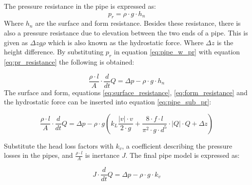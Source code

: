 The pressure resistance in the pipe is expressed as:
\begin{equation}\label{eq:pr_resistance}
p_r=\rho \cdot g \cdot h_n 
\end{equation}
Where $h_n$ are the surface and form resistance. Besides these resistance, there is also a pressure resistance due to elevation between the two ends of a pipe. This is given as $\Delta z g \rho$ which is also known as the hydrostatic force. Where $\Delta z$ is the height difference. By substituting $p_r$ in equation \ref{eq:pipe_w_pr} with equation \ref{eq:pr_resistance} the following is obtained:

\begin{equation} \label{eq:pipe_sub_pr}
\frac{\rho \cdot l}{A}\cdot \frac{d}{dt}Q = \Delta p - \rho \cdot g \cdot h_n 
\end{equation}
The surface and form, equations \ref{eq:surface_resistance}, \ref{eq:form_resistance} and the hydrostatic force can be inserted into equation \ref{eq:pipe_sub_pr}:



\begin{equation}\label{eq:final_pipe}
\frac{\rho \cdot l}{A} \cdot \frac{d}{dt}Q = \Delta p - \rho\cdot g\left(k_L \frac{ |v|\cdot v }{2\cdot g}+ \frac{8\cdot f  \cdot l}{\pi^2\cdot g \cdot d^5} \cdot |Q| \cdot Q + \Delta z \right) 
\end{equation}

Substitute the head loss factors with $k_v$, a coefficient describing the pressure losses in the pipes, and $\frac {\rho\cdot l}{A}$ is inertance $J$. The final pipe model is expressed as:

\begin{equation}\label{eq:pipe_model}
  \boxed{J\cdot \frac{d}{dt}Q = \Delta p - \rho \cdot g \cdot k_v}
\end{equation}
